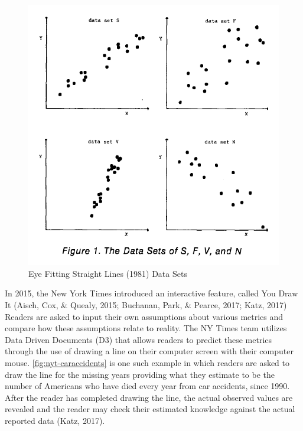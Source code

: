 \documentclass[print]{nuthesis}
\begin{document}
\begin{figure}[tbp]

{\centering \includegraphics[width=0.7\linewidth,]{images/eyefitting-straight-lines-plots} 

}

\caption{Eye Fitting Straight Lines (1981) Data Sets}\label{fig:mosteller-eyefitting-plot}
\end{figure}

In 2015, the New York Times introduced an interactive feature, called You Draw It (Aisch, Cox, \& Quealy, 2015; Buchanan, Park, \& Pearce, 2017; Katz, 2017)
Readers are asked to input their own assumptions about various metrics and compare how these assumptions relate to reality.
The NY Times team utilizes Data Driven Documents (D3) that allows readers to predict these metrics through the use of drawing a line on their computer screen with their computer mouse.
\cref{fig:nyt-caraccidents} is one such example in which readers are asked to draw the line for the missing years providing what they estimate to be the number of Americans who have died every year from car accidents, since 1990.
After the reader has completed drawing the line, the actual observed values are revealed and the reader may check their estimated knowledge against the actual reported data (Katz, 2017).
\end{document}
